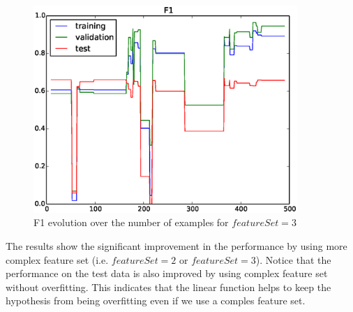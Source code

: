 \begin{figure}[hbtp]
\centering
\includegraphics[width=100mm]{F1_curve_3}
\caption{F1 evolution over the number of examples for $featureSet=3$}
\label{fig:F1_curve_3}
\end{figure}

The results show the significant improvement in the performance by using more complex feature set (i.e. $featureSet = 2$ or $featureSet = 3$). Notice that the performance on the test data is also improved by using complex feature set without overfitting. This indicates that the linear function helps to keep the hypothesis from being overfitting even if we use a comples feature set.



